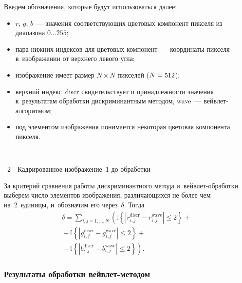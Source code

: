 \begin{multicols}{2}
Введем обозначения, которые будут использоваться далее:
\begin{itemize}
    \item $r$, $g$, $b$~--- значения соответствующих цветовых компонент 
    пикселя из диапазона $0\ldots255$;
    \item пара нижних индексов для цветовых компонент~--- координаты пикселя 
    в~изображении от верхнего левого угла;
    \item изображение имеет размер $N \times N$ пикселей ($N\hm=512$);
    \item верхний индекс~discr свидетельствует о принадлежности значения 
    к~результатам обработки дискриминантным методом, wave~--- 
    вейв\-лет-ал\-го\-рит\-мом;
    \item под элементом изображения понимается некоторая цветовая компонента пикселя.
\end{itemize}
 \noindent
 \begin{center}  %
 \vspace*{1pt}
 \mbox{%
 \epsfxsize=78mm
 }



\vspace*{3pt}

\noindent
{{\figurename~2}\ \ \small{Кадрированное изображение~1 до обработки}}

\end{center} 

 \vspace*{9pt}
 
 \addtocounter{figure}{1}



За критерий сравнения работы дискриминантного метода и~вейв\-лет-об\-ра\-бот\-ки 
выберем
число элементов изображения, различающихся не более чем на~2~единицы, 
и~обозначим его через~$\delta$. Тогда
\begin{multline*}
\delta=\sum\limits_{i,j=1,\ldots ,N}\left(
\mathbb{I}\left\{\left|r_{i,j}^{\mathrm{discr}}-r_{i,j}^{\mathrm{wave}}\right|
\leqslant2\right\}+{}\right.\\
{}+\mathbb{I}\left\{\left|g_{i,j}^{\mathrm{discr}}-
g_{i,j}^{\mathrm{wave}}\right|\leqslant2\right\}+{}\\
\left.{}+
\mathbb{I}\left\{\left|b_{i,j}^{\mathrm{discr}}-b_{i,j}^{\mathrm{wave}}\right|\leqslant2\right\}\right).
\end{multline*}


\subsubsection{Результаты обработки вейвлет-методом}


\end{multicols}
